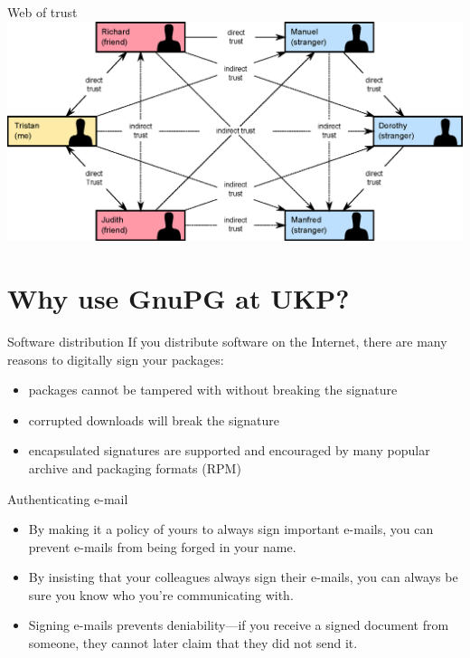 \documentclass[%
mode=present,%
paper=smartboard,
size=20pt,
]{powerdot}
\begin{document}
\begin{slide}[toc=]{Web of trust}
\centering\includegraphics[width=\linewidth]{images/Web_of_Trust.eps}
\end{slide}


\section{Why use GnuPG at UKP?}
\begin{slide}{Software distribution}
  If you distribute software on the Internet, there are many reasons
  to digitally sign your packages:\\[1ex]
  \begin{itemize}
  \item packages cannot be tampered with without breaking the signature
  \item corrupted downloads will break the signature
  \item encapsulated signatures are supported and encouraged by many
    popular archive and packaging formats (\eg RPM)
  \end{itemize}
\end{slide}

\begin{slide}{Authenticating e-mail}
  \begin{itemize}
  \item By making it a policy of yours to always sign important
    e-mails, you can prevent e-mails from being forged in your name.
  \item By insisting that your colleagues always sign their e-mails,
    you can always be sure you know who you're communicating with.
  \item Signing e-mails prevents deniability---if you receive a signed
    document from someone, they cannot later claim that they did not
    send it.
  \end{itemize}
\end{slide}
\end{document}
